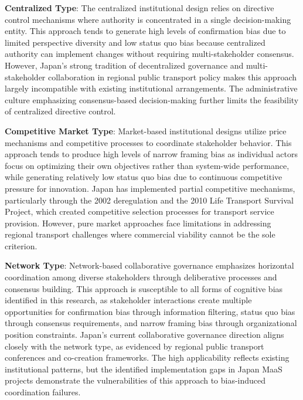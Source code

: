 \textbf{Centralized Type}: The centralized institutional design relies
on directive control mechanisms where authority is concentrated in a
single decision-making entity. This approach tends to generate high
levels of confirmation bias due to limited perspective diversity and low
status quo bias because centralized authority can implement changes
without requiring multi-stakeholder consensus. However, Japan's strong
tradition of decentralized governance and multi-stakeholder
collaboration in regional public transport policy makes this approach
largely incompatible with existing institutional arrangements. The
administrative culture emphasizing consensus-based decision-making
further limits the feasibility of centralized directive control.

\textbf{Competitive Market Type}: Market-based institutional designs
utilize price mechanisms and competitive processes to coordinate
stakeholder behavior. This approach tends to produce high levels of
narrow framing bias as individual actors focus on optimizing their own
objectives rather than system-wide performance, while generating
relatively low status quo bias due to continuous competitive pressure
for innovation. Japan has implemented partial competitive mechanisms,
particularly through the 2002 deregulation and the 2010 Life Transport
Survival Project, which created competitive selection processes for
transport service provision. However, pure market approaches face
limitations in addressing regional transport challenges where commercial
viability cannot be the sole criterion.

\textbf{Network Type}: Network-based collaborative governance emphasizes
horizontal coordination among diverse stakeholders through deliberative
processes and consensus building. This approach is susceptible to all
forms of cognitive bias identified in this research, as stakeholder
interactions create multiple opportunities for confirmation bias through
information filtering, status quo bias through consensus requirements,
and narrow framing bias through organizational position constraints.
Japan's current collaborative governance direction aligns closely with
the network type, as evidenced by regional public transport conferences
and co-creation frameworks. The high applicability reflects existing
institutional patterns, but the identified implementation gaps in Japan
MaaS projects demonstrate the vulnerabilities of this approach to
bias-induced coordination failures.

